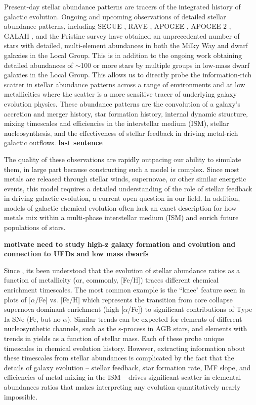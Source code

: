 \documentclass[12pt]{article} %
\begin{document}
Present-day stellar abundance patterns are tracers of the integrated history of galactic evolution. Ongoing and upcoming observations of detailed stellar abundance patterns, including SEGUE \citep{Yanny2009}, RAVE \citep{Kunder2017}, APOGEE \citep{Anders2014}, APOGEE-2 \citep{Majewski2016}, GALAH \citep{Buder2018}, and the Pristine survey \citep{Starkenburg2017} have obtained an unprecedented number of stars with detailed, multi-element abundances in both the Milky Way and dwarf galaxies in the Local Group. This is in addition to the ongoing work obtaining detailed abundances of $\sim$100 or more stars by multiple groups \cite[e.g.][ (need more!) ]{Hill2019} in low-mass dwarf galaxies in the Local Group. This allows us to directly probe the information-rich scatter in stellar abundance patterns across a range of environments and at low metallicities where the scatter is a more sensitive tracer of underlying galaxy evolution physics. These abundance patterns are the convolution of a galaxy's accretion and merger history, star formation history, internal dynamic structure, mixing timescales and efficiencies in the interstellar medium (ISM), stellar nucleosynthesis, and the effectiveness of stellar feedback in driving metal-rich galactic outflows. \textbf{last sentence}

The quality of these observations are rapidly outpacing our ability to simulate them, in large part because constructing such a model is complex.  Since most metals are released through stellar winds, supernovae, or other similar energetic events, this model requires a detailed understanding of the role of stellar feedback in driving galactic evolution, a current open question in our field.  In addition, models of galactic chemical evolution often lack an exact description for how metals mix within a multi-phase interstellar medium (ISM) and enrich future populations of stars.

\textbf{motivate need to study high-z galaxy formation and evolution and connection to UFDs and low mass dwarfs}

Since \cite{Tinsley1980}, its been understood that the evolution of stellar abundance ratios as a function of metallicity (or, commonly, [Fe/H]) traces different chemical enrichment timescales. The most common example is the ``knee" feature seen in plots of $[\alpha$/Fe] vs. [Fe/H] which represents the transition from core collapse supernova dominant enrichment (high $[\alpha$/Fe]) to significant contributions of Type Ia SNe (Fe, but no $\alpha$). Similar trends can be expected for elements of different nucleosynthetic channels, such as the s-process in AGB stars, and elements with trends in yields as a function of stellar mass. Each of these probe unique timescales in chemical evolution history. However, extracting information about these timescales from stellar abundances is complicated by the fact that the details of galaxy evolution -- stellar feedback, star formation rate, IMF slope, and efficiencies of metal mixing in the ISM -- drives significant scatter in elemental abundances ratios that makes interpreting any evolution quantitatively nearly impossible.
\end{document}
